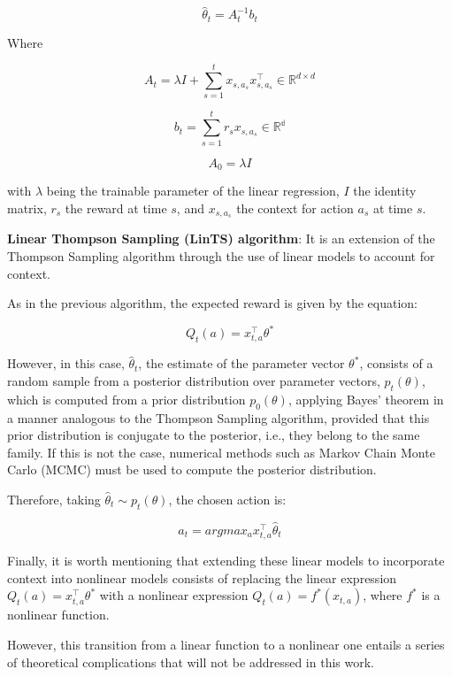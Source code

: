 \documentclass[../main.tex]{subfiles}
\begin{document}
\begin{equation*}
    \hat{\theta}_{t} = A_{t}^{-1} b_{t}
\end{equation*}

Where  

\begin{equation*}
    A_{t} = \lambda I + \sum_{s=1}^{t} x_{s, a_{s}} x_{s, a_{s}}^{\top} \in \mathbb{R}^{d \times d}
\end{equation*}

\begin{equation*}
    b_{t} = \sum_{s=1}^{t} r_{s} x_{s, a_{s}} \in \mathbb{R^{d}}
\end{equation*}

\begin{equation*}
    A_{0} = \lambda I
\end{equation*}

with $\lambda$ being the trainable parameter of the linear regression, $I$ the 
identity matrix, $r_{s}$ the reward at time $s$, and $x_{s, a_{s}}$ the context 
for action $a_{s}$ at time $s$.  

\textbf{Linear Thompson Sampling (LinTS) algorithm}: It is an extension of the 
Thompson Sampling algorithm through the use of linear models to account for 
context.  

As in the previous algorithm, the expected reward is given by the equation:  

\begin{equation*}
    Q_{t}\left(a\right) = x_{t, a}^{\top}\theta^{*}
\end{equation*}

However, in this case, $\hat{\theta}_{t}$, the estimate of the parameter vector 
$\theta^{*}$, consists of a random sample from a posterior distribution over 
parameter vectors, $p_{t}\left(\theta\right)$, which is computed from a prior 
distribution $p_{0}\left(\theta\right)$, applying Bayes’ theorem in a manner 
analogous to the Thompson Sampling algorithm, provided that this prior 
distribution is conjugate to the posterior, i.e., they belong to the same family. 
If this is not the case, numerical methods such as Markov Chain Monte Carlo (MCMC) 
must be used to compute the posterior distribution.  

Therefore, taking $\hat{\theta}_{t} \sim p_{t}\left(\theta\right)$, the chosen 
action is:  

\begin{equation*}
    a_{t} = argmax_{a}x_{t, a}^{\top}\hat{\theta}_{t}
\end{equation*}

Finally, it is worth mentioning that extending these linear models to incorporate 
context into nonlinear models consists of replacing the linear expression 
$Q_{t}\left(a\right)=x_{t, a}^{\top} \theta^{*}$ with a nonlinear expression 
$Q_{t}\left(a\right)=f^{*}\left(x_{t , a}\right)$, where $f^{*}$ is a nonlinear 
function.  

However, this transition from a linear function to a nonlinear one entails a 
series of theoretical complications that will not be addressed in this work.  
\end{document}
